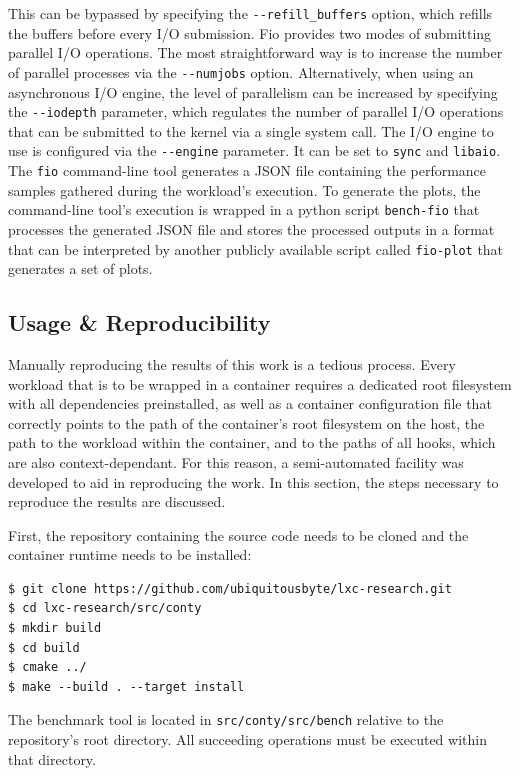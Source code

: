 This can be bypassed by specifying the \verb|--refill_buffers| option, which refills the 
buffers before every I/O submission. 
Fio provides two modes of submitting parallel I/O operations.
The most straightforward way is to increase the number of parallel processes via the 
\verb|--numjobs| option. Alternatively, when using an asynchronous I/O engine, the level of 
parallelism can be increased by specifying the \verb|--iodepth| parameter, which regulates 
the number of parallel I/O operations that can be submitted to the kernel via a single 
system call. The I/O engine to use is configured via the \verb|--engine| parameter. It can be set to 
\verb|sync| and \verb|libaio|. The \verb|fio| command-line tool generates a JSON file containing the 
performance samples gathered during the workload's execution. 
To generate the plots, the command-line tool's execution is wrapped in a python script \verb|bench-fio| \cite{fio-plot} 
that processes the generated JSON file and stores the processed outputs in a format that can be 
interpreted by another publicly available script called \verb|fio-plot| \cite{fio-plot}
that generates a set of plots.

\subsection{Usage \& Reproducibility}
Manually reproducing the results of this work is a tedious process. 
Every workload that is to be wrapped in a container requires a dedicated root filesystem 
with all dependencies preinstalled, as well as a container configuration file that correctly 
points to the path of the container's root filesystem on the host, the path to the workload within the container,
and to the paths of all hooks, which are also context-dependant. For this reason, 
a semi-automated facility was developed to aid in reproducing the work. In this section,
the steps necessary to reproduce the results are discussed.

First, the repository containing the source code needs to be cloned and the container runtime 
needs to be installed:
\begin{lstlisting}[label={code:implementation/benchmark/runtime-install}, style=bash, caption={Building and installing the container runtime}]
$ git clone https://github.com/ubiquitousbyte/lxc-research.git
$ cd lxc-research/src/conty
$ mkdir build
$ cd build 
$ cmake ../
$ make --build . --target install
\end{lstlisting}

The benchmark tool is located in \verb|src/conty/src/bench| relative to the 
repository's root directory. All succeeding operations must be executed within that directory. 

